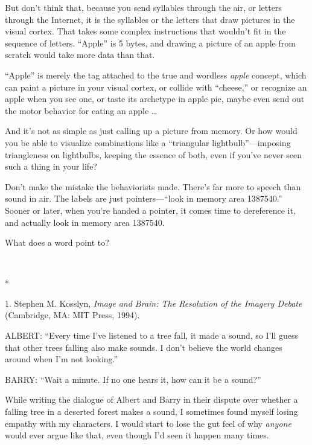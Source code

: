 {
 But don't think that, because you send syllables
through the air, or letters through the Internet, it is the syllables
or the letters that draw pictures in the visual cortex. That takes some
complex instructions that wouldn't fit in the sequence
of letters. ``Apple'' is 5 bytes,
and drawing a picture of an apple from scratch would take more data
than that.}

{
 ``Apple'' is merely the tag
attached to the true and wordless \textit{apple} concept, which can
paint a picture in your visual cortex, or collide with
``cheese,'' or recognize an apple
when you see one, or taste its archetype in apple pie, maybe even send
out the motor behavior for eating an apple \ldots}

{
 And it's not as simple as just calling up a
picture from memory. Or how would you be able to visualize combinations
like a ``triangular
lightbulb''---imposing triangleness on lightbulbs,
keeping the essence of both, even if you've never seen
such a thing in your life?}

{
 Don't make the mistake the behaviorists made.
There's far more to speech than sound in air. The
labels are just pointers---``look in memory area
1387540.'' Sooner or later, when
you're handed a pointer, it comes time to dereference
it, and actually look in memory area 1387540.}

{
 What does a word point to?}

{\centering
 \ ~
\par}

{\centering
 *
\par}


\bigskip

{
 1. Stephen M. Kosslyn, \textit{Image and Brain: The Resolution of
the Imagery Debate} (Cambridge, MA: MIT Press, 1994).}


{
 ALBERT: ``Every time I've
listened to a tree fall, it made a sound, so I'll guess
that other trees falling also make sounds. I don't
believe the world changes around when I'm not
looking.''}

{
 BARRY: ``Wait a minute. If no one hears it, how
can it be a sound?''}

{
 While writing the dialogue of Albert and Barry in their dispute
over whether a falling tree in a deserted forest makes a sound, I
sometimes found myself losing empathy with my characters. I would start
to lose the gut feel of why \textit{anyone} would ever argue like that,
even though I'd seen it happen many times.}

